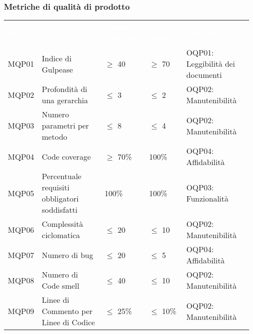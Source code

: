 \subsubsection{Metriche di qualità di prodotto}


\begin{table}[H]
    \renewcommand{\arraystretch}{1.5}
    \begin{tabular}{ m{}<{\centering}  m{}<{\centering}  m{}<{\centering}  m{}<{\centering} m{}<{\centering}}
        \rowcolor{darkblue}
        \textcolor{white}{\textbf{ID}} &\textcolor{white}{\textbf{Nome}}& \textcolor{white}{\textbf{Valore tollerato}} & \textcolor{white}{\textbf{Valore ottimo}} & \textcolor{white}{\textbf{Obiettivo}}\\ 
        MQP01 &
        Indice di Gulpease  &
        $\geq$ 40 &
        $\geq$ 70  &
        OQP01: Leggibilità dei documenti \\

        \rowcolor{gray!25}
        MQP02 &
        Profondità di una gerarchia &
        $\leq$ 3 &
        $\leq$ 2 &
        OQP02: Manutenibilità \\

        MQP03 &
        Numero parametri per metodo &
        $\leq$ 8 &
        $\leq$ 4 &
        OQP02: Manutenibilità \\

        \rowcolor{gray!25}
        MQP04 &
        Code coverage &
        $\geq$ 70\% &
        100\% &
        OQP04: Affidabilità \\

        MQP05 &
        Percentuale requisiti obbligatori soddisfatti &
        100\% &
        100\% &
        OQP03: Funzionalità \\

        \rowcolor{gray!25}
        MQP06 &
        Complessità ciclomatica &
        $\leq$ 20 &
        $\leq$ 10 &
        OQP02: Manutenibilità \\

        MQP07 &
        Numero di bug &
        $\leq$ 20 &
        $\leq$ 5 &
        OQP04: Affidabilità \\

        \rowcolor{gray!25}
        MQP08 &
        Numero di Code smell &
        $\leq$ 40 &
        $\leq$ 10 &
        OQP02: Manutenibilità \\

        MQP09 &
        Linee di Commento per Linee di Codice  &
        $\leq$ 25\% &
        $\leq$ 10\% &
        OQP02: Manutenibilità \\


\end{tabular}
\end{table}
